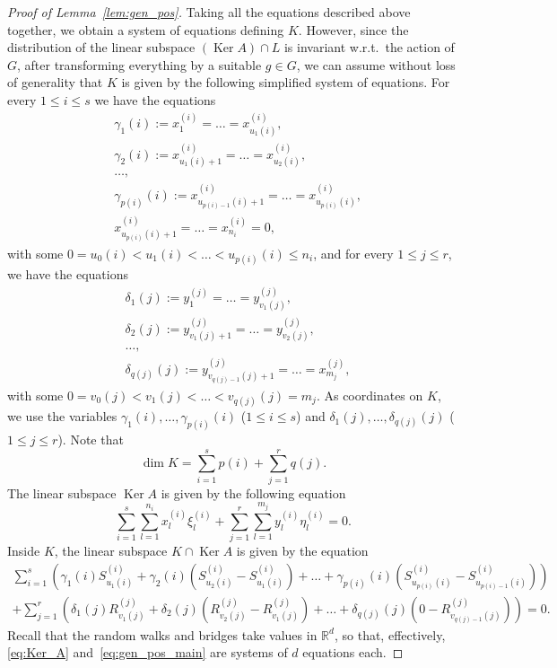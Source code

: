 \documentclass[12pt, reqno]{amsart}
\theoremstyle{plain}
\theoremstyle{definition}
\theoremstyle{remark}
\begin{document}
\begin{proof}[Proof of Lemma~\ref{lem:gen_pos}]
Taking all the equations described above together, we obtain a system of equations defining $K$.  However, since the distribution of the linear subspace $(\operatorname*{Ker} A)\cap L$ is invariant w.r.t.\ the action of $G$, after transforming everything by a suitable $g\in G$, we can assume without loss of generality that $K$ is given by the following simplified system of equations.
For every $1\leq i \leq s$ we have the equations
\begin{align*}
&\gamma_1(i):= x^{(i)}_1 = \ldots = x^{(i)}_{u_{1}(i)},\\
&\gamma_2(i) := x^{(i)}_{u_{1}(i) +1} = \ldots = x^{(i)}_{u_{2}(i)},\\
&\ldots,\\
&\gamma_{p(i)}(i):= x^{(i)}_{u_{p(i)-1}(i)+1} = \ldots = x^{(i)}_{u_{p(i)}(i)},\\
&x^{(i)}_{u_{p(i)}(i)+1} = \ldots = x^{(i)}_{n_i} = 0,
\end{align*}
with some $0=u_{0}(i) < u_1(i) < \ldots < u_{p(i)}(i) \leq n_i$, and for every $1\leq j\leq r$, we have the equations
\begin{align*}
&\delta_1(j):=  y^{(j)}_1 = \ldots = y^{(j)}_{v_{1}(j)},\\
&\delta_2(j) := y^{(j)}_{v_{1}(j) +1} = \ldots = y^{(j)}_{v_{2}(j)},\\
&\ldots,\\
&\delta_{q(j)}(j):= y^{(j)}_{v_{q(j)-1}(j)+1} = \ldots = x^{(j)}_{m_j},
\end{align*}
with some $0=v_{0}(j) < v_1(j) < \ldots < v_{q(j)}(j) = m_j$. As coordinates on $K$, we use the variables $\gamma_1(i), \ldots, \gamma_{p(i)}(i)$ ($1\leq i \leq s$) and $\delta_1(j), \ldots, \delta_{q(j)}(j)$ ($1\leq j \leq r$). Note that
\begin{equation}\label{eq:dim_K}
\dim K = \sum_{i=1}^s p(i) + \sum_{j=1}^r q(j).
\end{equation}
The linear subspace $\operatorname*{Ker} A$ is given by the following equation
\begin{equation}\label{eq:Ker_A}
\sum_{i=1}^s \sum_{l=1}^{n_i} x_l^{(i)} \xi_l^{(i)}   + \sum_{j=1}^r \sum_{l=1}^{m_j} y_l^{(i)} \eta_l^{(i)} = 0.
\end{equation}
Inside $K$, the linear subspace $K\cap \operatorname*{Ker} A$ is given by the equation
\begin{multline}\label{eq:gen_pos_main}
\sum_{i=1}^s
\left(\gamma_1(i) S^{(i)}_{u_1(i)} +   \gamma_2(i) (S^{(i)}_{u_2(i)} - S^{(i)}_{u_1(i)}) +\ldots + \gamma_{p(i)}(i) (S^{(i)}_{u_{p(i)}(i)} - S^{(i)}_{u_{p(i)-1}(i)}) \right)
\\+
\sum_{j=1}^r \left( \delta_1(j) R^{(j)}_{v_1(j)} +   \delta_2(j) (R^{(j)}_{v_2(j)} - R^{(j)}_{v_1(j)}) +\ldots + \delta_{q(j)}(j) (0 - R^{(j)}_{v_{q(j)-1}(j)})\right)
=0.
\end{multline}
Recall that the random walks and bridges take values in ${\mathbb{R}}^d$, so that, effectively, \eqref{eq:Ker_A} and~\eqref{eq:gen_pos_main} are systems of $d$ equations each.


\end{proof}
\end{document}
